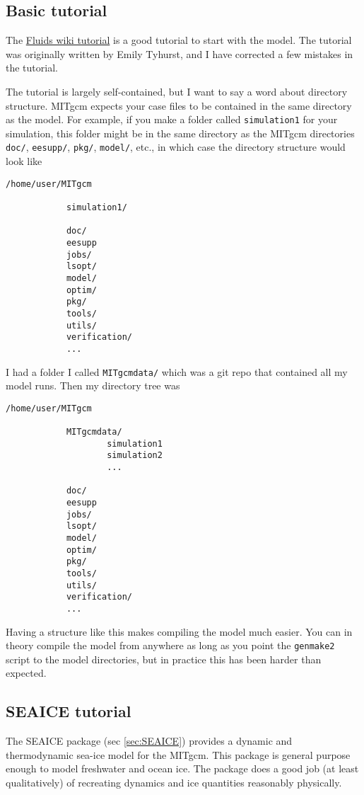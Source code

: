 \documentclass[11pt]{article}
\begin{document}
\subsection{Basic tutorial}
The \href{https://wiki.math.uwaterloo.ca/fluidswiki/index.php?title=MITgcmTutorial}{Fluids wiki tutorial} is a good tutorial to start with the model. The tutorial was originally written by Emily Tyhurst, and I have corrected a few mistakes in the tutorial.

The tutorial is largely self-contained, but I want to say a word about directory structure. MITgcm expects your case files to be contained in the same directory as the model. For example, if you make a folder called \verb|simulation1| for your simulation, this folder might be in the same directory as the MITgcm directories \verb|doc/|, \verb|eesupp/|, \verb|pkg/|, \verb|model/|, etc., in which case the directory structure would look like

\begin{lstlisting}
/home/user/MITgcm
			
			simulation1/

			doc/
			eesupp
			jobs/
			lsopt/
			model/
			optim/
			pkg/
			tools/
			utils/
			verification/
			...
\end{lstlisting}

I had a folder I called \verb|MITgcmdata/| which was a git repo that contained all my model runs. Then my directory tree was

\begin{lstlisting}
/home/user/MITgcm
			
			MITgcmdata/
					simulation1
					simulation2
					...

			doc/
			eesupp
			jobs/
			lsopt/
			model/
			optim/
			pkg/
			tools/
			utils/
			verification/
			...
\end{lstlisting}

Having a structure like this makes compiling the model much easier. You can in theory compile the model from anywhere as long as you point the \verb|genmake2| script to the model directories, but in practice this has been harder than expected.

\subsection{SEAICE tutorial}
The SEAICE package (sec \ref{sec:SEAICE}) provides a dynamic and thermodynamic sea-ice model for the MITgcm. This package is general purpose enough to model freshwater and ocean ice. The package does a good job (at least qualitatively) of recreating dynamics and ice quantities reasonably physically.
\end{document}
